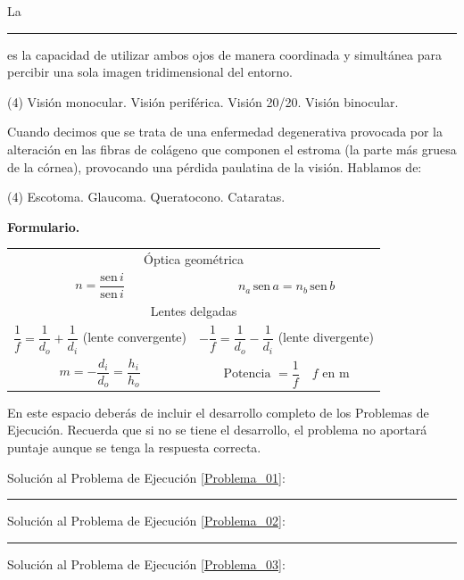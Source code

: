 \documentclass[12pt, letter]{exam}
\begin{document}
\begin{questions}
\begin{tasks}
    \end{tasks}
    \question  La \rule{2cm}{0.1mm} es la capacidad de utilizar ambos ojos de manera coordinada y simultánea para percibir una sola imagen tridimensional del entorno.
    \begin{tasks}(4)
        \task Visión monocular.
        \task Visión periférica.
        \task Visión 20/20.
        \task Visión binocular.
    \end{tasks}
    \question Cuando decimos que se trata de una enfermedad degenerativa provocada por la alteración en las fibras de colágeno que componen el estroma (la parte más gruesa de la córnea), provocando una pérdida paulatina de la visión. Hablamos de:
    \begin{tasks}(4)
        \task Escotoma.
        \task Glaucoma.
        \task Queratocono.
        \task Cataratas.
    \end{tasks}
\end{questions}

\newpage

\textbf{\huge{Formulario.}}
\begin{table}[H]
    \centering
    \setlength{\tabcolsep}{40pt}
    \renewcommand{\arraystretch}{2.5}
    \begin{tabular}{c  c}
        \multicolumn{2}{c}{Óptica geométrica} \\
        $n = \dfrac{\text{sen} \, i}{\text{sen} \, i}$ & $n_{a} \, \text{sen} \,  a = n_{b} \, \text{sen} \,  b$ \\ \hline
        \multicolumn{2}{c}{Lentes delgadas} \\
        $\dfrac{1}{f} = \dfrac{1}{d_{o}} + \dfrac{1}{d_{i}}$ (lente convergente) & $- \dfrac{1}{f} = \dfrac{1}{d_{o}} - \dfrac{1}{d_{i}}$ (lente divergente) \\
        $m = - \dfrac{d_{i}}{d_{o}} = \dfrac{h_{i}}{h_{o}}$ & $\text{Potencia } = \dfrac{1}{f} \quad f \text{ en } \unit{\meter}$ \\ \hline
\end{tabular}
\end{table}

En este espacio deberás de incluir el desarrollo completo de los Problemas de Ejecución. Recuerda que si no se tiene el desarrollo, el problema no aportará puntaje aunque se tenga la respuesta correcta.

\vspace*{0.5cm}
Solución al Problema de Ejecución \ref{Problema_01}:

\vspace*{4cm}
\rule{0.9\textwidth}{0.3mm}

Solución al Problema de Ejecución \ref{Problema_02}:

\vspace*{4.5cm}
\rule{0.9\textwidth}{0.3mm}

Solución al Problema de Ejecución \ref{Problema_03}:
\end{document}
